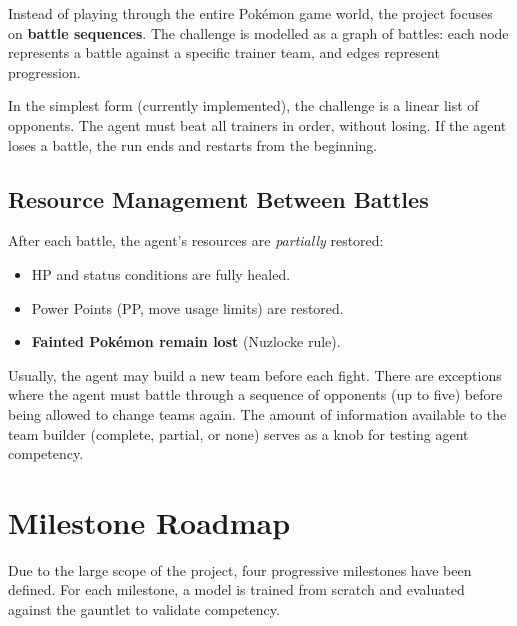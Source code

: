Instead of playing through the entire Pok\'{e}mon game world, the project
focuses on \textbf{battle sequences}.  The challenge is modelled as a graph of
battles: each node represents a battle against a specific trainer team, and
edges represent progression.

In the simplest form (currently implemented), the challenge is a linear list
of opponents.  The agent must beat all trainers in order, without losing.  If
the agent loses a battle, the run ends and restarts from the beginning.

\subsection{Resource Management Between Battles}

After each battle, the agent's resources are \emph{partially} restored:

\begin{itemize}
  \item HP and status conditions are fully healed.
  \item Power Points (PP, move usage limits) are restored.
  \item \textbf{Fainted Pok\'{e}mon remain lost} (Nuzlocke rule).
\end{itemize}

Usually, the agent may build a new team before each fight.  There are
exceptions where the agent must battle through a sequence of opponents (up to
five) before being allowed to change teams again.  The amount of information
available to the team builder (complete, partial, or none) serves as a knob
for testing agent competency.

\section{Milestone Roadmap}

Due to the large scope of the project, four progressive milestones have been
defined.  For each milestone, a model is trained from scratch and evaluated
against the gauntlet to validate competency.

